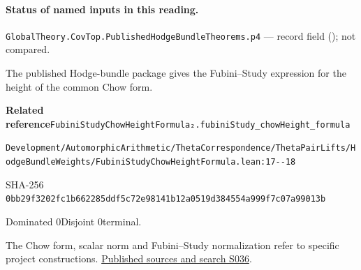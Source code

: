 

\paragraph{Status of named inputs in this reading.}
\noindent\nolinkurl{GlobalTheory.CovTop.PublishedHodgeBundleTheorems.p4} --- record field (); not compared.\par

\begin{formalstatement}[D155]\label{decomp:D155}
The published Hodge-bundle package gives the Fubini–Study expression for the height of the common Chow form.
\end{formalstatement}
{\small\raggedright\noindent\textsf{\bfseries Related reference}\quad \nolinkurl{FubiniStudyChowHeightFormula₂.fubiniStudy_chowHeight_formula}\par\noindent \nolinkurl{Development/AutomorphicArithmetic/ThetaCorrespondence/ThetaPairLifts/HodgeBundleWeights/FubiniStudyChowHeightFormula.lean:17--18}\par\noindent SHA-256 \nolinkurl{0bb29f3202fc1b662285ddf5c72e98141b12a0519d384554a999f7c07a99013b}\par\noindent Dominated 0\quad Disjoint 0\quad terminal.\par}
The Chow form, scalar norm and Fubini–Study normalization refer to specific project constructions.
\hyperref[lit:S036]{Published sources and search S036}.
